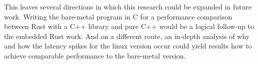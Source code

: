 This leaves several directions in which this research could be expanded in future work.
Writing the bare-metal program in C for a performance comparison between Rust with a C++ library and pure C++ would be a logical follow-up to the embedded Rust work.
And on a different route, an in-depth analysis of why and how the latency spikes for the linux version occur could yield results how to achieve comparable performance to the bare-metal version.

